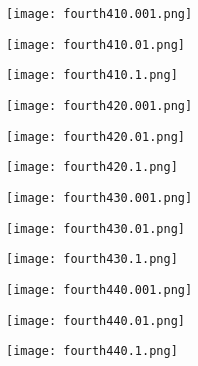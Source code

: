 \documentclass[12pt]{article}
\begin{document}
\begin{figure}[H]

	\centering
	\begin{minipage}{.5\textwidth}
		\centering
		\texttt{[image: fourth410.001.png]}
	\end{minipage}%
	\begin{minipage}{.5\textwidth}
		\centering
		\texttt{[image: fourth410.01.png]}
	\end{minipage}
\end{figure}

\begin{figure}[H]

	\centering
	\begin{minipage}{.5\textwidth}
		\centering
		\texttt{[image: fourth410.1.png]}
	\end{minipage}%
	\begin{minipage}{.5\textwidth}
		\centering
		\texttt{[image: fourth420.001.png]}
	\end{minipage}
\end{figure}

\begin{figure}[H]

	\centering
	\begin{minipage}{.5\textwidth}
		\centering
		\texttt{[image: fourth420.01.png]}
	\end{minipage}%
	\begin{minipage}{.5\textwidth}
		\centering
		\texttt{[image: fourth420.1.png]}
	\end{minipage}
\end{figure}





\begin{figure}[H]

	\centering
	\begin{minipage}{.5\textwidth}
		\centering
		\texttt{[image: fourth430.001.png]}
	\end{minipage}%
	\begin{minipage}{.5\textwidth}
		\centering
		\texttt{[image: fourth430.01.png]}
	\end{minipage}
\end{figure}

\begin{figure}[H]

	\centering
	\begin{minipage}{.5\textwidth}
		\centering
		\texttt{[image: fourth430.1.png]}
	\end{minipage}%
	\begin{minipage}{.5\textwidth}
		\centering
		\texttt{[image: fourth440.001.png]}
	\end{minipage}
\end{figure}

\begin{figure}[H]

	\centering
	\begin{minipage}{.5\textwidth}
		\centering
		\texttt{[image: fourth440.01.png]}
	\end{minipage}%
	\begin{minipage}{.5\textwidth}
		\centering
		\texttt{[image: fourth440.1.png]}
	\end{minipage}
\end{figure}
\end{document}

